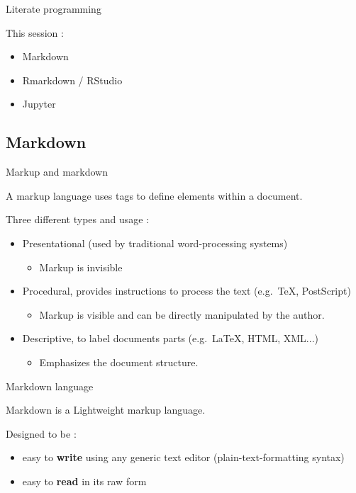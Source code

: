 \begin{frame}{Literate programming}

This session :
\begin{itemize}
  \item Markdown
  \item Rmarkdown / RStudio
  \item Jupyter
\end{itemize}

\end{frame}

\subsection{Markdown}

\begin{frame}{Markup and markdown}

\begin{definition}
A markup language uses tags to define elements within a document.
\end{definition}
\vfill
Three different types and usage :
\begin{itemize}
  \item Presentational (used by traditional word-processing systems)
  \begin{itemize}
      \item Markup is invisible
  \end{itemize}
  \item Procedural, provides instructions to process the text (e.g.\ TeX, PostScript)
  \begin{itemize}
      \item Markup is visible and can be directly manipulated by the author.
  \end{itemize}
  \item Descriptive, to label documents parts (e.g.\ LaTeX, HTML, XML...)
  \begin{itemize}
      \item Emphasizes the document structure.
  \end{itemize}
\end{itemize}

\end{frame}

\begin{frame}{Markdown language}

Markdown is a Lightweight markup language.

Designed to be :
\begin{itemize}
    \item easy to \textbf{write} using any generic text editor (plain-text-formatting syntax)
    \item easy to \textbf{read} in its raw form
\end{itemize}

\end{frame}

